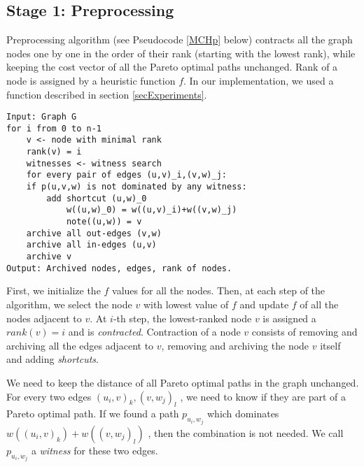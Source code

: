 

\subsection{Stage 1: Preprocessing}
\label{subsecStage1}

Preprocessing algorithm (see Pseudocode \ref{MCHp} below) contracts all the graph nodes one by one in the order of their rank (starting with the lowest rank), while keeping the cost vector of all the Pareto optimal paths unchanged. Rank of a node is assigned by a heuristic function $f$. In our implementation, we used a function described in section \ref{secExperiments}.

\renewcommand{\lstlistingname}{Pseudocode}
\begin{lstlisting}[caption={MCHp},label=MCHp,captionpos=t,float,abovecaptionskip=-\medskipamount]
Input: Graph G
for i from 0 to n-1
    v <- node with minimal rank
    rank(v) = i
    witnesses <- witness search
    for every pair of edges (u,v)_i,(v,w)_j:
    if p(u,v,w) is not dominated by any witness:
        add shortcut (u,w)_0
            w((u,w)_0) = w((u,v)_i)+w((v,w)_j)
            note((u,w)) = v
    archive all out-edges (v,w) 
    archive all in-edges (u,v)
    archive v
Output: Archived nodes, edges, rank of nodes.
\end{lstlisting}

First, we initialize the $f$ values for all the nodes. Then, at each step of the algorithm, we select the node $v$ with lowest value of $f$ and update $f$ of all the nodes adjacent to $v$. 
At $i$-th step, the lowest-ranked node $v$ is assigned a $rank(v) = i$ and is \emph{contracted}. 
Contraction of a node $v$ consists of removing and archiving all the edges adjacent to $v$, removing and archiving the node $v$ itself and adding {\em shortcuts}. 

We need to keep the distance of all Pareto optimal paths in the graph unchanged. For every two edges $(u_i,v)_k,(v,w_j)_l$ , we need to know if they are part of a Pareto optimal path. If we found a path $p_{u_i,w_j}$ which dominates $w((u_i,v)_k)+w((v,w_j)_l)$ , then the combination is not needed. We call $p_{u_i,w_j}$ a \emph{witness} for these two edges. 

